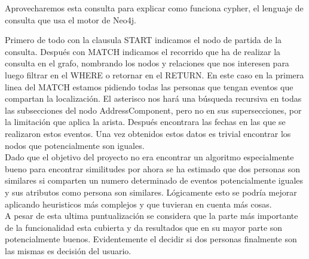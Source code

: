 Aprovecharemos esta consulta para explicar como funciona cypher, el lenguaje de consulta que usa el motor de Neo4j.

Primero de todo con la clausula START indicamos el nodo de partida de la consulta.
Después con MATCH indicamos el recorrido que ha de realizar la consulta en el grafo, nombrando los nodos y relaciones que nos interesen para luego filtrar en el WHERE o retornar en el RETURN. En este caso en la primera linea del MATCH estamos pidiendo todas las personas que tengan eventos que compartan la localización. El asterisco nos hará una búsqueda recursiva en todas las subsecciones del nodo AddressComponent, pero no en sus supersecciones, por la limitación que aplica la arista. Después encontrara las fechas en las que se realizaron estos eventos. Una vez obtenidos estos datos es trivial encontrar los nodos que potencialmente son iguales.\\
Dado que el objetivo del proyecto no era encontrar un algoritmo especialmente bueno para encontrar similitudes por ahora se ha estimado que dos personas son similares si comparten un numero determinado de eventos potencialmente iguales y sus atributos como persona son similares.  Lógicamente esto se podría mejorar aplicando heuristicos más complejos y que tuvieran en cuenta más cosas.\\
A pesar de esta ultima puntualización se considera que la parte más importante de la funcionalidad esta cubierta y da resultados que en su mayor parte son potencialmente buenos. Evidentemente el decidir si dos personas finalmente son las mismas es decisión del usuario.

